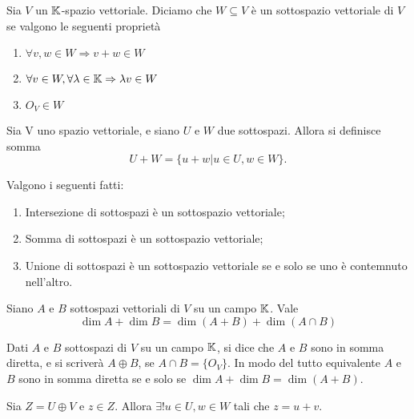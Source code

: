 \begin{definition}
       Sia $ V $ un $ \mathbb{K} $-spazio vettoriale. Diciamo che $ W \subseteq V $ è un sottospazio vettoriale di $ V $ se valgono le seguenti proprietà
       \begin{enumerate}[label=(\roman*)]
               \item $ \forall v, w \in W \Rightarrow v + w \in W $
               \item $ \forall v \in W, \forall \lambda \in \mathbb{K} \Rightarrow \lambda v \in W $
               \item $ O_V \in W $
       \end{enumerate}
\end{definition}

\begin{definition}
	Sia V uno spazio vettoriale, e siano $U$ e $W$ due sottospazi. Allora si definisce somma
	\[ U+W = \{ u + w | u \in U, w \in W \}. \]
\end{definition}

\begin{prop}
	Valgono i seguenti fatti: 
	\begin{enumerate}[label=(\roman*)]
		\item Intersezione di sottospazi è un sottospazio vettoriale;
		\item Somma di sottospazi è un sottospazio vettoriale;
		\item Unione di sottospazi è un sottospazio vettoriale se e solo se uno è contemnuto nell'altro.
	\end{enumerate}
\end{prop}


\begin{thm}
	Siano $ A $ e $ B $ sottospazi vettoriali di $ V $ su un campo $ \mathbb{K} $. Vale \[\dim{A} + \dim{B} = \dim{(A + B)} + \dim{(A \cap B)}\]
\end{thm}

\begin{definition}
	Dati $ A $ e $ B $ sottospazi di $ V $ su un campo $ \mathbb{K} $, si dice che $ A $ e $ B $ sono in somma diretta, e si scriverà $ A \oplus B$, se $ A \cap B = \{O_V\} $.
	In modo del tutto equivalente $ A $ e $ B $ sono in somma diretta se e solo se $ \dim{A} + \dim{B} =  \dim{(A + B)} $.	
\end{definition}

\begin{prop}
	Sia $ Z = U \oplus V $ e $ z \in Z$. Allora $ \exists! u \in U, w \in W$ tali che $ z = u + v $.
\end{prop}
	
